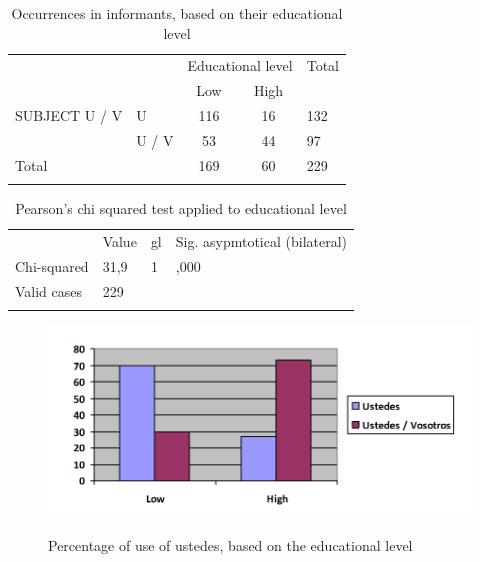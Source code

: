 \documentclass[output=paper]{LSP/langsci}
\begin{document}
\begin{table}
\begin{tabular}{llccl}
\lsptoprule
& & \multicolumn{2}{c}{Educational level} & Total\\
& & Low & High & \\
\midrule
SUBJECT U / V & U & 116 & 16 & 132\\
& U / V & 53 & 44 & 97\\
Total & & 169 & 60 & 229\\
\lspbottomrule
\end{tabular}
\caption{Occurrences in informants, based on their educational level}
\label{tab:8}
\end{table} 

\begin{table}
\begin{tabular}{llll}
\lsptoprule
\multicolumn{4}{c}{\bfseries Pearson’s chi squared}\\
\midrule
& Value & gl & 
\begin{minipage}[t]{0.15\textwidth}Sig. asypmtotical (bilateral)\end{minipage}  \\
\midrule
\begin{minipage}[t]{0.15\textwidth}Chi-squared \end{minipage} & 31,9 & 1 & ,000 \\
\begin{minipage}[t]{0.15\textwidth}Valid cases\end{minipage} & 229 &  & \\
\lspbottomrule
\end{tabular}
\label{tab:9}
\caption{Pearson’s chi squared test applied to educational level} 
\end{table}

\begin{figure}
\includegraphics[width=\textwidth]{illustrations/lara_fig5}
\label{fig:5}
\caption{Percentage of use of ustedes, based on the educational level}
\end{figure}
\end{document}
